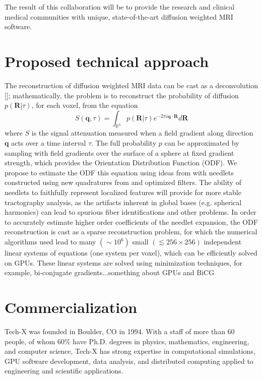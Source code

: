 \documentclass[10pt]{article}
\begin{document}
The result of this collaboration will be to provide the research and clinical
medical communities with unique, state-of-the-art diffusion weighted MRI
software.

\section*{Proposed technical approach}

The reconstruction of diffusion weighted MRI data can be cast as a
deconvolution [\cite{Lenglet2008, JIA-VEM-2007}]; mathematically, the problem is
to reconstruct the probability of diffusion $p({\mathbf R}|\tau)$, for each
voxel, from the equation
\begin{equation*}
  S\left({\mathbf q},\tau\right) = \int_{\mathbb{R}^3} p({\mathbf R}|\tau)
e^{-2\pi i {\mathbf q}\cdot {\mathbf R}} d{\mathbf R}
\end{equation*}
where $S$ is the signal attenuation measured when a field gradient along
direction ${\mathbf q}$ acts over a time interval $\tau$.  The full probability
$p$ can be approximated by sampling with field gradients over the surface of a
sphere at fixed gradient strength, which provides the Orientation Distribution
Function (ODF). We propose to estimate the ODF this equation using ideas from
\cite{KE-NG-PI-2009} with needlets constructed using new quadratures from
\cite{AHR-BEY-2009} and optimized filters.  The ability of needlets to
faithfully represent localized features will provide for more stable
tractography analysis, as the artifacts inherent in global bases
(e.g. spherical harmonics) can lead to spurious fiber identifications and other
problems.  In order to accurately estimate higher order coefficients of the
needlet expansion, the ODF reconstruction is cast as a sparse reconstruction
problem, for which the numerical algorithms used lead to many $(\sim 10^6)$
small $(\lesssim 256\times256)$ independent linear systems of equations (one
system per voxel), which can be efficiently solved on GPUs. These linear
systems are solved using minimization techniques, for example, bi-conjugate
gradients...something about GPUs and BiCG

\section*{Commercialization}
Tech-X was founded in Boulder, CO in 1994. With a staff of more than 60 people,
of whom 60\% have Ph.D. degrees in physics, mathematics, engineering, and
computer science, Tech-X has strong expertise in computational simulations, GPU
software development, data analysis, and distributed computing applied to
engineering and scientific applications.
\end{document}
